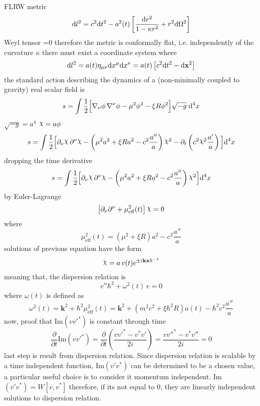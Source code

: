 FLRW metric
\begin{equation}
	\text{d} l^2 =c^2\text{d} t^2 -a^2(t)\left[\frac{\text{d} r^2}{1-\kappa r^2}+r^2\text{d}\Omega^2\right]
\end{equation}
Weyl tensor =0 therefore the metric is conformally flat, i.e. independently of the curvature $\kappa$ there must exist a coordinate system where 
\begin{equation}
	\text{d} l^2=a(t)\eta_{\mu\nu}\text{d} x^\mu\text{d} x^\nu=a(t)\left[c^2\text{d} t^2-\text{d}\mathbf{x}^2\right]
\end{equation}
the standard action describing  the dynamics of a (non-minimally coupled to gravity) real scalar field is
\begin{equation}
	s=\int\frac{1}{2}\Big[\nabla_\nu\phi\,\nabla^\nu\phi-\mu^2\phi^2-\xi R\phi^2\Big]\sqrt{-g}\;\text{d}^4 x
\end{equation}
$\sqrt{-g}=a^4$ $\rchi=a\phi$
\begin{equation}
	s=\int\frac{1}{2}\Big[\partial_\nu\rchi\,\partial^\nu\rchi-\left(\mu^2a^2+\xi R a^2-c^2\frac{a''}{a}\right)\rchi^2-\partial_t\left(c^2\rchi^2\frac{a'}{a}\right)\Big]\td^4 x
\end{equation}
dropping the time derivative
\begin{equation}
	s=\int\frac{1}{2}\Big[\partial_\nu\rchi\,\partial^\nu\rchi-\left(\mu^2a^2+\xi R a^2-c^2\frac{a''}{a}\right)\rchi^2\Big]\td^4 x
\end{equation}
by Euler-Lagrange
\begin{equation}
	\left[\partial_\nu\partial^\nu+\mu_{\text{eff}}^2(t)\right]\rchi=0
\end{equation}
where
\begin{equation}
	\mu_{\text{eff}}^2(t)=\left(\mu^2+\xi R\right)a^2-c^2\frac{a''}{a}
\end{equation}
solutions of previous equation have the form
\begin{equation}
	\rchi=a\,v(t)e^{\pm i\mathbf{kx}\hbar^{-1}} 
\end{equation}
meaning that, the dispersion relation is
\begin{equation}
	v''\hbar^2+\omega^2(t)\,v=0
\end{equation}
where $\omega(t)$ is defined as
\begin{equation}
	\omega^2(t)=\mathbf{k}^2+\hbar^2\mu_{\text{eff}}^2(t)=\mathbf{k}^2+\left(m^2c^2+\xi\hbar^2 R\right)a(t)-\hbar^2c^2\frac{a''}{a}
\end{equation}
now, proof that Im$(vv'^{*})$ is constant through time
\begin{equation}
	\frac{\partial}{\partial t}\text{Im}(vv'^{*})=\frac{\partial}{\partial t}\left(\frac{vv'^{*}-v^{*}v'}{2i}\right)=\frac{vv''^*-v^{*}v''}{2i}=0
\end{equation}
last step is result from dispersion relation. Since dispersion relation is scalable by a time independent function, Im$(v'v^*)$ can be determined to be a chosen value, a particular useful choice is to consider it momentum independent. Im$(v'v^*)=W[v,v^*]$ therefore, if  its not equal to 0, they are linearly independent solutions to dispersion relation.



